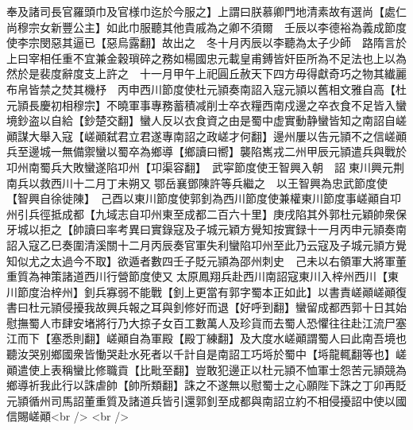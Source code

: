 奉及諸司長官羅頭巾及官様巾迄於今服之】上謂曰朕慕卿門地清素故有選尚【處仁尚穆宗女新豐公主】如此巾服聽其他貴戚為之卿不須爾　壬辰以李德裕為義成節度使李宗閔惡其逼已【惡烏露翻】故出之　冬十月丙辰以李聽為太子少師　路隋言於上曰宰相任重不宜兼金穀瑣碎之務如楊國忠元載皇甫鎛皆奸臣所為不足法也上以為然於是裴度辭度支上許之　十一月甲午上祀圓丘赦天下四方毋得獻奇巧之物其纎麗布帛皆禁之焚其機杼　丙申西川節度使杜元頴奏南詔入寇元頴以舊相文雅自高【杜元頴長慶初相穆宗】不曉軍事專務蓄積减削士卒衣糧西南戍邊之卒衣食不足皆入蠻境鈔盗以自給【鈔楚交翻】蠻人反以衣食資之由是蜀中虚實動静蠻皆知之南詔自嵯顚謀大舉入寇【嵯顚弑君立君遂專南詔之政嵯才何翻】邊州屢以告元頴不之信嵯顚兵至邊城一無備禦蠻以蜀卒為鄉導【鄉讀曰嚮】襲陷嶲戎二州甲辰元頴遣兵與戰於卭州南蜀兵大敗蠻遂陷卭州【卭渠容翻】　武寜節度使王智興入朝　詔東川興元荆南兵以救西川十二月丁未朔又鄂岳襄鄧陳許等兵繼之　以王智興為忠武節度使【智興自徐徙陳】　己酉以東川節度使郭釗為西川節度使兼權東川節度事嵯顚自卭州引兵徑抵成都【九域志自卭州東至成都二百六十里】庚戌陷其外郭杜元穎帥衆保牙城以拒之【帥讀曰率考異曰實錄寇及子城元穎方覺知按實録十一月丙申元頴奏南詔入寇乙巳奏圍清溪關十二月丙辰奏官軍失利蠻陷卭州至此乃云寇及子城元頴方覺知似尤之太過今不取】欲遁者數四壬子貶元頴為邵州刺史　己未以右領軍大將軍董重質為神策諸道西川行營節度使又太原鳳翔兵赴西川南詔寇東川入梓州西川【東川節度治梓州】釗兵寡弱不能戰【釗上更當有郭字蜀本正如此】以書責嵯顚嵯顚復書曰杜元頴侵擾我故興兵報之耳與釗修好而退【好呼到翻】蠻留成都西郭十日其始慰撫蜀人市肆安堵將行乃大掠子女百工數萬人及珍貨而去蜀人恐懼往往赴江流尸塞江而下【塞悉則翻】嵯顚自為軍殿【殿丁練翻】及大度水嵯顚謂蜀人曰此南吾境也聽汝哭别鄉國衆皆慟哭赴水死者以千計自是南詔工巧埓於蜀中【埓龍輒翻等也】嵯顚遣使上表稱蠻比修職貢【比毗至翻】豈敢犯邊正以杜元頴不恤軍士怨苦元頴競為鄉導祈我此行以誅虐帥【帥所類翻】誅之不遂無以慰蜀士之心願陛下誅之丁卯再貶元頴循州司馬詔董重質及諸道兵皆引還郭釗至成都與南詔立約不相侵擾詔中使以國信賜嵯顚<br />
<br />
